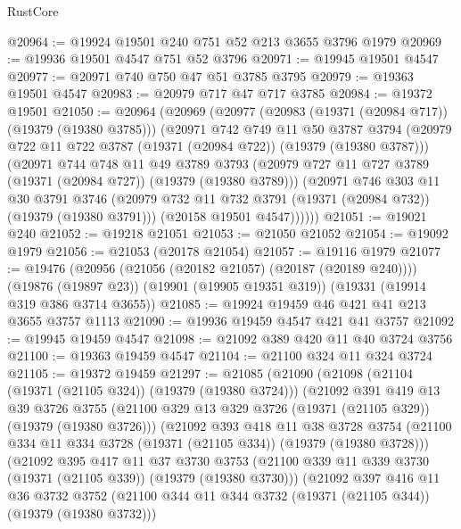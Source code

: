 \begin{lexlean}{RustCore}
\begin{coremodule}
@20964 := @19924 @19501 @240 @751 @52 @213 @3655 @3796 @1979
@20969 := @19936 @19501 @4547 @751 @52 @3796
@20971 := @19945 @19501 @4547
@20977 := @20971 @740 @750 @47 @51 @3785 @3795
@20979 := @19363 @19501 @4547
@20983 := @20979 @717 @47 @717 @3785
@20984 := @19372 @19501
@21050 := @20964
    (@20969
      (@20977
        (@20983 (@19371 (@20984 @717)) (@19379 (@19380 @3785)))
        (@20971
          @742
          @749
          @11
          @50
          @3787
          @3794
          (@20979 @722 @11 @722 @3787 (@19371 (@20984 @722)) (@19379 (@19380 @3787)))
          (@20971
            @744
            @748
            @11
            @49
            @3789
            @3793
            (@20979 @727 @11 @727 @3789 (@19371 (@20984 @727)) (@19379 (@19380 @3789)))
            (@20971
              @746
              @303
              @11
              @30
              @3791
              @3746
              (@20979 @732 @11 @732 @3791 (@19371 (@20984 @732)) (@19379 (@19380 @3791)))
              (@20158 @19501 @4547))))))
@21051 := @19021 @240
@21052 := @19218 @21051
@21053 := @21050 @21052
@21054 := @19092 @1979
@21056 := @21053 (@20178 @21054)
@21057 := @19116 @1979
@21077 := @19476
    (@20956 (@21056 (@20182 @21057) (@20187 (@20189 @240))))
    (@19876 (@19897 @23))
    (@19901 (@19905 @19351 @319))
    (@19331 (@19914 @319 @386 @3714 @3655))
@21085 := @19924 @19459 @46 @421 @41 @213 @3655 @3757 @1113
@21090 := @19936 @19459 @4547 @421 @41 @3757
@21092 := @19945 @19459 @4547
@21098 := @21092 @389 @420 @11 @40 @3724 @3756
@21100 := @19363 @19459 @4547
@21104 := @21100 @324 @11 @324 @3724
@21105 := @19372 @19459
@21297 := @21085
    (@21090
      (@21098
        (@21104 (@19371 (@21105 @324)) (@19379 (@19380 @3724)))
        (@21092
          @391
          @419
          @13
          @39
          @3726
          @3755
          (@21100 @329 @13 @329 @3726 (@19371 (@21105 @329)) (@19379 (@19380 @3726)))
          (@21092
            @393
            @418
            @11
            @38
            @3728
            @3754
            (@21100 @334 @11 @334 @3728 (@19371 (@21105 @334)) (@19379 (@19380 @3728)))
            (@21092
              @395
              @417
              @11
              @37
              @3730
              @3753
              (@21100 @339 @11 @339 @3730 (@19371 (@21105 @339)) (@19379 (@19380 @3730)))
              (@21092
                @397
                @416
                @11
                @36
                @3732
                @3752
                (@21100 @344 @11 @344 @3732 (@19371 (@21105 @344)) (@19379 (@19380 @3732)))

\end{coremodule}
\end{lexlean}
